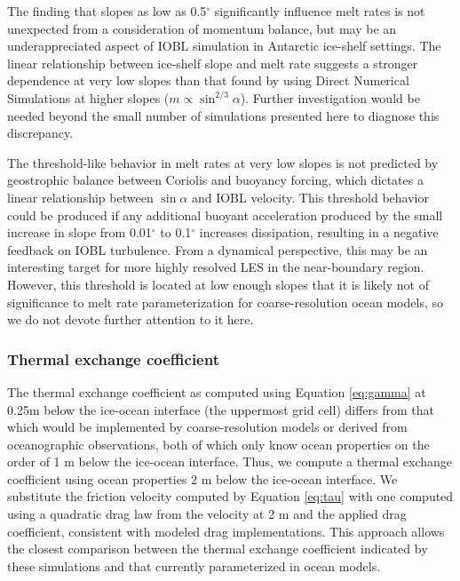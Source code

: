 \documentclass[draft]{agujournal2019}
\begin{document}
The finding that slopes as low as 0.5$^{\circ}$ significantly influence melt rates is not unexpected from a consideration of momentum balance, but may be an underappreciated aspect of IOBL simulation in Antarctic ice-shelf settings. The linear relationship between ice-shelf slope and melt rate suggests a stronger dependence at very low slopes than that found by \cite{mondal_ablation_2019} using Direct Numerical Simulations at higher slopes ($m \propto \sin^{2/3}\alpha$). Further investigation would be needed beyond the small number of simulations presented here to diagnose this discrepancy. 

The threshold-like behavior in melt rates at very low slopes is not predicted by geostrophic balance between Coriolis and buoyancy forcing, which dictates a linear relationship between $\sin\alpha$ and IOBL velocity. This threshold behavior could be produced if any additional buoyant acceleration produced by the small increase in slope from 0.01$^{\circ}$ to 0.1$^{\circ}$ increases dissipation, resulting in a negative feedback on IOBL turbulence. From a dynamical perspective, this may be an interesting target for more highly resolved LES in the near-boundary region. However, this threshold is located at low enough slopes that it is likely not of significance to melt rate parameterization for coarse-resolution ocean models, so we do not devote further attention to it here. 


\subsubsection{Thermal exchange coefficient}

The thermal exchange coefficient as computed using Equation \ref{eq:gamma} at 0.25m below the ice-ocean interface (the uppermost grid cell) differs from that which would be implemented by coarse-resolution models or derived from oceanographic observations, both of which only know ocean properties on the order of 1 m below the ice-ocean interface. Thus, we compute a thermal exchange coefficient using ocean properties 2 m below the ice-ocean interface. We substitute the friction velocity computed by Equation \ref{eq:tau} with one computed using a quadratic drag law from the velocity at 2 m and the applied drag coefficient, consistent with modeled drag implementations. This approach allows the closest comparison between the thermal exchange coefficient indicated by these simulations and that currently parameterized in ocean models. 
\end{document}
